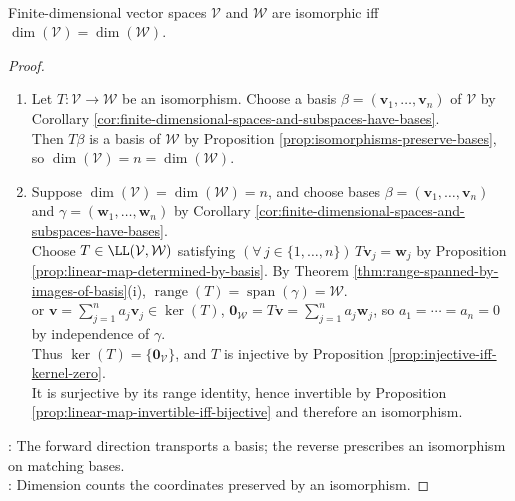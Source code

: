\begin{theorem} \label{thm:finite-dimensional-isomorphic-iff-same-dimension} \\
Finite-dimensional vector spaces $\mathcal{V}$ and $\mathcal{W}$ are isomorphic iff $\dim(\mathcal{V})=\dim(\mathcal{W})$.
\begin{proof}
\begin{enumerate}[label=\roman*.]
\setlength{\itemsep}{0pt}
\item[$(\Rightarrow)$] Let $T:\mathcal{V}\to\mathcal{W}$ be an isomorphism. Choose a basis $\beta=(\mathbf{v}_1,\ldots,\mathbf{v}_n)$ of $\mathcal{V}$ by Corollary \ref{cor:finite-dimensional-spaces-and-subspaces-have-bases}.\\
Then $T\beta$ is a basis of $\mathcal{W}$ by Proposition \ref{prop:isomorphisms-preserve-bases}, so $\dim(\mathcal{V})=n=\dim(\mathcal{W})$.
\item[$(\Leftarrow)$] Suppose $\dim(\mathcal{V})=\dim(\mathcal{W})=n$, and choose bases $\beta=(\mathbf{v}_1,\ldots,\mathbf{v}_n)$ and $\gamma=(\mathbf{w}_1,\ldots,\mathbf{w}_n)$ by Corollary \ref{cor:finite-dimensional-spaces-and-subspaces-have-bases}.\\
Choose $T\in\LL(\mathcal{V},\mathcal{W})$ satisfying $(\forall\,j\in\{1,\ldots,n\})\,T\mathbf{v}_j=\mathbf{w}_j$ by Proposition \ref{prop:linear-map-determined-by-basis}. By Theorem \ref{thm:range-spanned-by-images-of-basis}(i), $\operatorname{range}(T)=\operatorname{span}(\gamma)=\mathcal{W}$. \\
or $\mathbf{v}=\sum\limits_{j=1}^{n}a_j\mathbf{v}_j\in\ker(T)$, $\mathbf{0}_{\mathcal{W}}=T\mathbf{v}=\sum\limits_{j=1}^{n}a_j\mathbf{w}_j$, so $a_1=\cdots=a_n=0$ by independence of $\gamma$.\\
Thus $\ker(T)=\{\mathbf{0}_{\mathcal{V}}\}$, and $T$ is injective by Proposition \ref{prop:injective-iff-kernel-zero}.\\
It is surjective by its range identity, hence invertible by Proposition \ref{prop:linear-map-invertible-iff-bijective} and therefore an isomorphism.
\end{enumerate}
: The forward direction transports a basis; the reverse prescribes an isomorphism on matching bases.\\
: Dimension counts the coordinates preserved by an isomorphism.
\end{proof}
\end{theorem}
